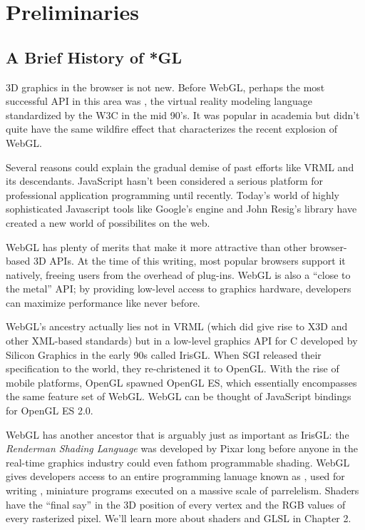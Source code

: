 \chapter{Preliminaries}

\section{A Brief History of *GL}

3D graphics in the browser is not new.  Before WebGL, perhaps the most successful API in this area was , the virtual reality modeling language standardized by the W3C in the mid 90's.  It was popular in academia but didn't quite have the same wildfire effect that characterizes the recent explosion of WebGL.

Several reasons could explain the gradual demise of past efforts like VRML and its descendants.  JavaScript hasn't been considered a serious platform for professional application programming until recently.  Today's world of highly sophisticated Javascript tools like Google's  engine  and John Resig's  library have created a new world of possibilites on the web.

WebGL has plenty of merits that make it more attractive than other browser-based 3D APIs.  At the time of this writing, most popular browsers support it natively, freeing users from the overhead of plug-ins.  WebGL is also a ``close to the metal'' API; by providing low-level access to graphics hardware, developers can maximize performance like never before.

WebGL's ancestry actually lies not in VRML (which did give rise to X3D and other XML-based standards) but in a low-level graphics API for C developed by Silicon Graphics in the early 90s called IrisGL.  When SGI released their specification to the world, they re-christened it to OpenGL.   With the rise of mobile platforms, OpenGL spawned OpenGL ES, which essentially encompasses the same feature set of WebGL.  WebGL can be thought of JavaScript bindings for OpenGL ES 2.0.

WebGL has another ancestor that is arguably just as important as IrisGL: the \emph{Renderman Shading Language} was developed by Pixar long before anyone in the real-time graphics industry could even fathom programmable shading.  WebGL gives developers access to an entire programming lanuage known as , used for writing , miniature programs executed on a massive scale of parrelelism.  Shaders have the ``final say'' in the 3D position of every vertex and the RGB values of every rasterized pixel.  We'll learn more about shaders and GLSL in Chapter 2.

